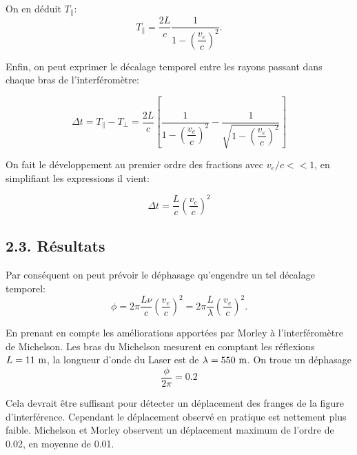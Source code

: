 \documentclass[french, a4paper, 10pt, twocolumn, landscape]{article}
\begin{document}
On en déduit $T_\parallel$:
\begin{equation}
	T_\parallel=\dfrac{2L}{c}\dfrac{1}{1-\left(\dfrac{v_e}{c}\right)^2}.
\end{equation}

Enfin, on peut exprimer le décalage temporel entre les rayons passant dans chaque bras de l'interféromètre: 

\begin{equation}
	\Delta t = T_\parallel - T_\perp = \dfrac{2L}{c}\left[\dfrac{1}{1-\left(\dfrac{v_e}{c}\right)^2}-\dfrac{1}{\sqrt{1-\left(\dfrac{v_e}{c}\right)^2}}\right]
\end{equation}

On fait le développement au premier ordre des fractions avec $v_e/c <<1$, en simplifiant les expressions il vient: 

\begin{equation}
	\Delta t = \dfrac{L}{c}\left(\dfrac{v_e}{c}\right)^2
\end{equation}

\subsection*{2.3. Résultats}

Par conséquent on peut prévoir le déphasage qu'engendre un tel décalage temporel: 
\begin{equation}
	\phi = 2\pi\dfrac{L\nu}{c}\left(\dfrac{v_e}{c}\right)^2 = 2\pi\dfrac{L}{\lambda}\left(\dfrac{v_e}{c}\right)^2.
\end{equation}

En prenant en compte les améliorations apportées par Morley à l'interféromètre de Michelson. Les bras du Michelson mesurent en comptant les réflexions $L=11~\rm m$, la longueur d'onde du Laser est de $\lambda=550~\rm m$. On trouc un déphasage 
\begin{equation}
	\dfrac{\phi}{2\pi} = 0.2
\end{equation}

Cela devrait être suffisant pour détecter un déplacement des franges de la figure d'interférence. Cependant le déplacement observé en pratique est nettement plus faible. Michelson et Morley observent un déplacement maximum de l'ordre de 0.02, en moyenne de 0.01.

\end{document}
